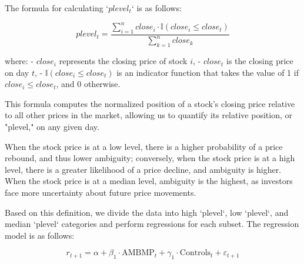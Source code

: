 \documentclass[preprint,12pt,authoryear]{elsarticle}
\begin{document}
The formula for calculating `$plevel_t$` is as follows:

\begin{equation}
plevel_t = \frac{\sum_{i=1}^n close_i \cdot \mathbb{I}(close_i \leq close_t)}{\sum_{k=1}^n close_k}
\end{equation}

where:
- \( close_i \) represents the closing price of stock \( i \),
- \( close_t \) is the closing price on day \( t \),
- \( \mathbb{I}(close_i \leq close_t) \) is an indicator function that takes the value of 1 if \( close_i \leq close_t \), and 0 otherwise.

This formula computes the normalized position of a stock's closing price relative to all other prices in the market, allowing us to quantify its relative position, or "plevel," on any given day.


When the stock price is at a low level, there is a higher probability of a price rebound, and thus lower ambiguity; conversely, when the stock price is at a high level, there is a greater likelihood of a price decline, and ambiguity is higher. When the stock price is at a median level, ambiguity is the highest, as investors face more uncertainty about future price movements.

Based on this definition, we divide the data into high `plevel`, low `plevel`, and median `plevel` categories and perform regressions for each subset. The regression model is as follows:

\begin{equation}
r_{t+1} = \alpha + \beta_1 \cdot \mathrm{AMBMP}_t + \gamma_1 \cdot \mathrm{Controls}_t + \varepsilon_{t+1}
\end{equation}
\end{document}

